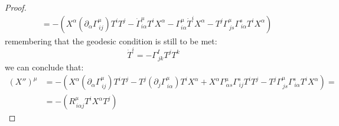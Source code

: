 \documentclass[Main]{subfiles}
\begin{document}
\begin{proof}
\begin{align*}
			&=			
			-\left(
			X^\alpha\left(\partial_\alpha\Gamma^{\mu}_{\, i j}\right)T^i T^j - \dot{\Gamma}^\mu_{i \alpha} T^i X^\alpha
			- \Gamma^\mu_{i \alpha} \dot{T}^i X^\alpha  - T^j \Gamma^\mu_{\, j s} \Gamma^s_{\, i \alpha} T^i X^\alpha				
			\right)
		\end{align*}
		remembering that the geodesic condition is still to be met:
		\begin{displaymath}
			\dot{T}^i = - \Gamma^I_{\, j k} T^j T^k
		\end{displaymath}
		we can conclude that:
		\begin{align*}
			\left(X'' \right)^\mu &=
			- \left(
			  X^\alpha\left( \partial_\alpha\Gamma^\mu_{\, i j}\right)T^i T^j
			- T^j \left( \partial_j \Gamma^\mu_{\, i \alpha}\right) T^i X^\alpha
			+X^\alpha \Gamma^\mu_{\, \alpha s} \Gamma^s_{\, i j}T^i T^j 
			- T^j \Gamma^\mu_{\, j s} \Gamma^s_{\, i \alpha} T^i X^\alpha
			\right) =\\
			&=	-\left( R^\mu_{\, i \alpha j}T^i X^\alpha T^j\right)		
		\end{align*}
	\end{proof}
	
	

	
	
\end{document}
